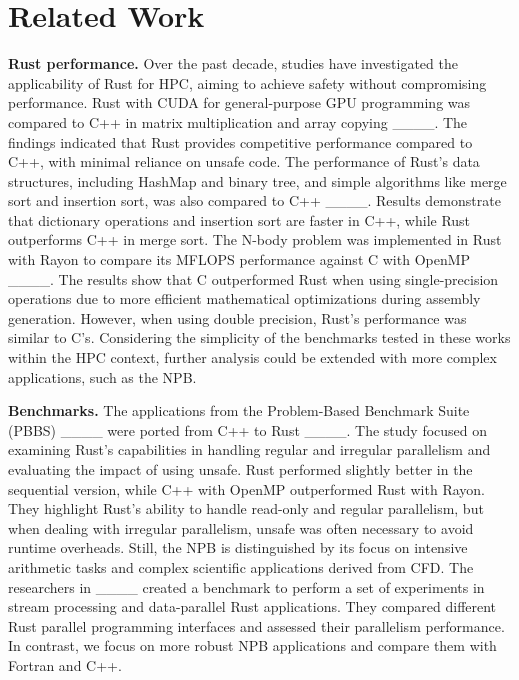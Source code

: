 \section{Related Work}
\label{sec:rw}
\textbf{Rust performance.} Over the past decade, studies have investigated the applicability of Rust for HPC, aiming to achieve safety without compromising performance. Rust with CUDA for general-purpose GPU programming was compared to C++ in matrix multiplication and array copying ____. The findings indicated that Rust provides competitive performance compared to C++, with minimal reliance on unsafe code. The performance of Rust's data structures, including HashMap and binary tree, and simple algorithms like merge sort and insertion sort, was also compared to C++ ____. Results demonstrate that dictionary operations and insertion sort are faster in C++, while Rust outperforms C++ in merge sort. The N-body problem was implemented in Rust with Rayon to compare its MFLOPS performance against C with OpenMP ____. The results show that C outperformed Rust when using single-precision operations due to more efficient mathematical optimizations during assembly generation. However, when using double precision, Rust's performance was similar to C's. Considering the simplicity of the benchmarks tested in these works within the HPC context, further analysis could be extended with more complex applications, such as the NPB.

\textbf{Benchmarks.} The applications from the Problem-Based Benchmark Suite (PBBS) ____ were ported from C++ to Rust ____. The study focused on examining Rust's capabilities in handling regular and irregular parallelism and evaluating the impact of using unsafe. Rust performed slightly better in the sequential version, while C++ with OpenMP outperformed Rust with Rayon. They highlight Rust's ability to handle read-only and regular parallelism, but when dealing with irregular parallelism, unsafe was often necessary to avoid runtime overheads. Still, the NPB is distinguished by its focus on intensive arithmetic tasks and complex scientific applications derived from CFD. The researchers in ____ created a benchmark to perform a set of experiments in stream processing and data-parallel Rust applications. They compared different Rust parallel programming interfaces and assessed their parallelism performance. In contrast, we focus on more robust NPB applications and compare them with Fortran and C++.

